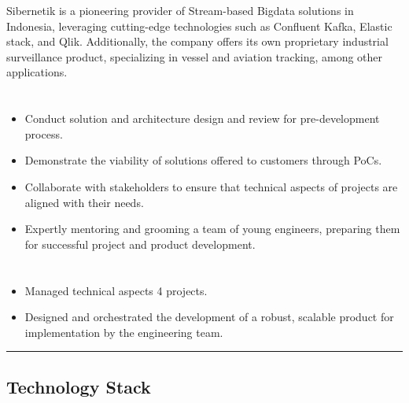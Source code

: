 \documentclass[12pt]{res}
\begin{document}
\begin{resume}
\begin{multicols}{2}
	\columnbreak
	{\footnotesize{Sibernetik is a pioneering provider of Stream-based Bigdata solutions in Indonesia, leveraging cutting-edge technologies such as Confluent Kafka, Elastic stack, and Qlik. Additionally, the company offers its own proprietary industrial surveillance product, specializing in vessel and aviation tracking, among other applications.}}\\
\end{multicols}
\vspace{-20pt}

\begin{multicols}{2}
	\section{}
		\begin{itemize}
			\item Conduct solution and architecture design and review for pre-development process.
\item Demonstrate the viability of solutions offered to customers through PoCs.
\item Collaborate with stakeholders to ensure that technical aspects of projects are aligned with their needs.
\item Expertly mentoring and grooming a team of young engineers, preparing them for successful project and product development.
		\end{itemize}
	\section{}
		\begin{itemize}
			\setlength{\itemindent}{0pt}
			\item Managed technical aspects 4 projects.
\item Designed and orchestrated the development of a robust, scalable product for implementation by the engineering team.
		\end{itemize}
\end{multicols}

\vspace{-20pt}
\begin{minipage}[t]{0.55\linewidth}
	\rule{0.25\textwidth}{2pt}
	\begin{multicols}{2}
		\section{Technology Stack}
		\columnbreak

\end{multicols}
\end{minipage}
\end{resume}
\end{document}
